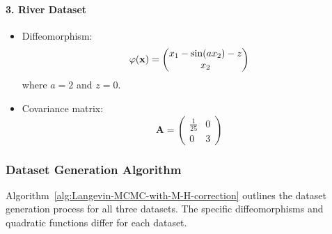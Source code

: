 \paragraph{3. River Dataset}

\begin{itemize}
    \item Diffeomorphism: 
    \[
    \varphi(\mathbf{x}) = \begin{pmatrix} 
    x_1 - \sin(a x_2) - z \\
    x_2 
    \end{pmatrix}
    \]
    where $a = 2$ and $z = 0$.
    \item Covariance matrix:
    \[
    \mathbf{A} = \begin{pmatrix} 
    \frac{1}{25} & 0 \\
    0 & 3 
    \end{pmatrix}
    \]
\end{itemize}

\subsubsection{Dataset Generation Algorithm}

Algorithm~\ref{alg:Langevin-MCMC-with-M-H-correction} outlines the dataset generation process for all three datasets. The specific diffeomorphisms and quadratic functions differ for each dataset.

